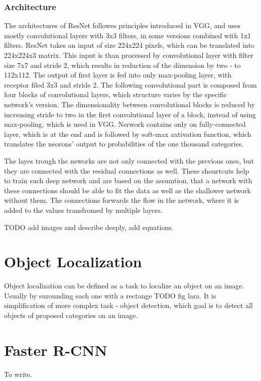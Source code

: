 \subsubsection{Architecture}
The architectures of ResNet followes principles introduced in VGG, and uses mostly convolutional
layers with 3x3 filters, in some versions combined with 1x1 filters. ResNet takes an input of
size 224x224 pixels, which can be translated into 224x224x3 matrix. This input is than processed
by convolutional layer with filter size 7x7 and stride 2, which results in reduction of the 
dimension by two - to 112x112. The output of first layer is fed into only max-pooling layer,
with receptor filed 3x3 and stride 2. The following convolutional part is composed from four
blocks of convolutional layers, which structure varies by the specific network's version.
The dimensionality between convolutional blocks is reduced by increasing stride to two
in the first convolutional layer of a block, instead of using max-pooling, which is used in VGG.
Nerwork contains only on fully-connected layer, which is at the end and is followed by 
soft-max axtivation function, which translates the neorons' output to probabilities of the
one thousand categories.


The layes trough the neworks are not only connected with the previous ones, but 
they are connected with the residual connections as well. These shourtcuts help to
train such deep network and are based on the assumtion, that a network with these
connections should be able to fit the data as well as the shallower network without them.
The connections forwards the flow in the network, where it is added to the values 
transfromed by multiple layers.

TODO add images and describe deeply, add equations. 





\section{Object Localization}
Object localization can be defined as a task to localize an object on an image. Usually
by surounding each one with a rectange TODO fig lara. It is simplification of more
complex task - object detection, which goal is to detect all objects of proposed categories
on an image. 

\section{Faster R-CNN}
To write.

